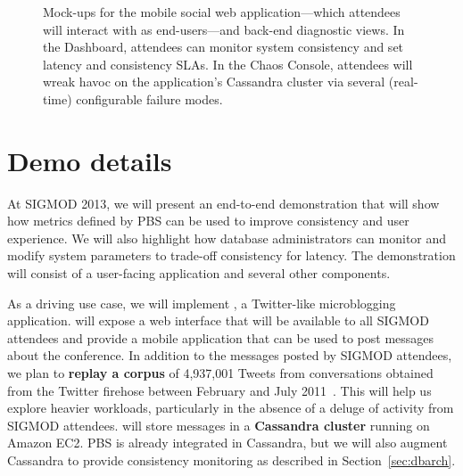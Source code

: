 \begin{figure*}[!tb]
\centering
\hspace{0.12in}
\hspace{0.12in}
\caption{Mock-ups for the mobile social web application---which
  attendees will interact with as end-users---and back-end diagnostic
  views. In the Dashboard, attendees can monitor system consistency
  and set latency and consistency SLAs. In the Chaos Console,
  attendees will wreak havoc on the application's Cassandra cluster
  via several (real-time) configurable failure modes.}
\vspace{-1em}
\label{fig:pbs-demo-screenshot}
\end{figure*}

\section{Demo details}
\label{sec:demo}

At SIGMOD 2013, we will present an end-to-end demonstration that will
show how metrics defined by PBS can be used to improve consistency and
user experience. We will also highlight how database administrators
can monitor and modify system parameters to trade-off consistency for
latency. The demonstration will consist of a user-facing application
and several other components.


As a driving use case, we will implement \textbf{{\systemname}}, a
Twitter-like microblogging application. {\systemname} will expose a
web interface that will be available to all SIGMOD attendees and
provide a mobile application that can be used to post messages about
the conference. In addition to the messages posted by SIGMOD
attendees, we plan to \textbf{replay a corpus} of 4,937,001 Tweets
from conversations obtained from the Twitter firehose between February
and July 2011~\cite{ritter2010unsupervised}. This will help us explore
heavier workloads, particularly in the absence of a deluge of activity
from SIGMOD attendees. {\systemname} will store messages in a
\textbf{Cassandra cluster} running on Amazon EC2. PBS is already
integrated in Cassandra, but we will also augment Cassandra to provide
consistency monitoring as described in Section~\ref{sec:dbarch}.

